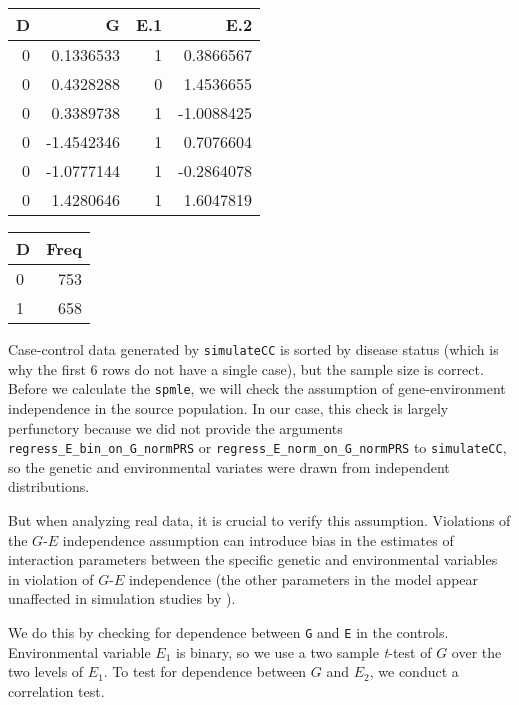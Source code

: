 \documentclass[11pt,]{article}
\let\origtable\table
\let\endorigtable\endtable
\renewenvironment{table}[1][2] {
    \expandafter\origtable\expandafter[H]
} {
    \endorigtable
}
\begin{document}
\begin{table}
\caption{Simulated PLCO data}

\centering
\begin{tabular}[t]{rrrr}
\toprule
D & G & E.1 & E.2\\
\midrule
0 & 0.1336533 & 1 & 0.3866567\\
0 & 0.4328288 & 0 & 1.4536655\\
0 & 0.3389738 & 1 & -1.0088425\\
0 & -1.4542346 & 1 & 0.7076604\\
0 & -1.0777144 & 1 & -0.2864078\\
0 & 1.4280646 & 1 & 1.6047819\\
\bottomrule
\end{tabular}
\centering
\begin{tabular}[t]{lr}
\toprule
D & Freq\\
\midrule
0 & 753\\
1 & 658\\
\bottomrule
\end{tabular}
\end{table}

Case-control data generated by \texttt{simulateCC} is sorted by disease
status (which is why the first 6 rows do not have a single case), but
the sample size is correct. Before we calculate the \texttt{spmle}, we
will check the assumption of gene-environment independence in the source
population. In our case, this check is largely perfunctory because we
did not provide the arguments \texttt{regress\_E\_bin\_on\_G\_normPRS}
or \texttt{regress\_E\_norm\_on\_G\_normPRS} to \texttt{simulateCC}, so
the genetic and environmental variates were drawn from independent
distributions.

But when analyzing real data, it is crucial to verify this assumption.
Violations of the \(G\)-\(E\) independence assumption can introduce bias
in the estimates of interaction parameters between the specific genetic
and environmental variables in violation of \(G\)-\(E\) independence
(the other parameters in the model appear unaffected in simulation
studies by \citeauthor{Stalder2017}).

We do this by checking for dependence between \texttt{G} and \texttt{E}
in the controls. Environmental variable \(E_1\) is binary, so we use a
two sample \emph{t}-test of \(G\) over the two levels of \(E_1\). To
test for dependence between \(G\) and \(E_2\), we conduct a correlation
test.
\end{document}
